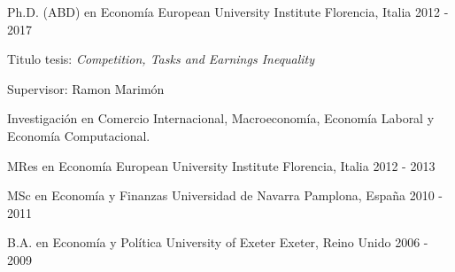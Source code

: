 

\begin{cventries}

  \cventry
    {Ph.D. (ABD) en Economía} %
    {European University Institute} %
    {Florencia, Italia} %
    {2012 - 2017} %
    {
        \begin{cvitems} %
            \item {Titulo tesis: \textit{Competition, Tasks and Earnings Inequality}}
            \item {Supervisor: Ramon Marimón}
            \item {Investigación en Comercio Internacional, Macroeconomía, Economía Laboral y Economía Computacional.}
        \end{cvitems}
    }

\cventry
    {MRes en Economía} %
    {European University Institute} %
    {Florencia, Italia} %
    {2012 - 2013} %
    {}

\cventry
    {MSc en Economía y Finanzas} %
    {Universidad de Navarra} %
    {Pamplona, España} %
    {2010 - 2011} %
    {}

\cventry
    {B.A. en Economía y Política} %
    {University of Exeter} %
    {Exeter, Reino Unido} %
    {2006 - 2009} %
    {}

\end{cventries}


